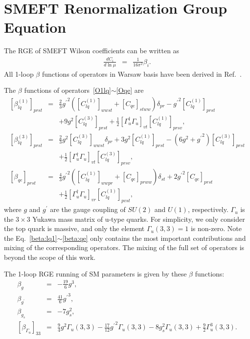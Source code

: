 \documentclass[a4paper,11pt]{article}
\begin{document}
\appendix
	



\section{SMEFT Renormalization Group Equation}\label{smeftrge}
The RGE of SMEFT Wilson coefficients can be written as 
\begin{eqnarray}
  \frac{dC_i}{d\ln{\mu}} &=& \frac{1}{16\pi^2}\beta_i. \label{beta:definition}
\end{eqnarray}
All 1-loop $\beta$ functions of operators in Warsaw basis have been derived in Ref.~\cite{Celis:2017hod}. 

The $\beta$ functions of operators~\ref{O1lq}$\sim$\ref{Oqe} are
\begin{eqnarray}
   \left[\beta^{(1)}_{lq}\right]_{prst} &=& \frac{2}{3}{g^\prime}^2\left([C^{(1)}_{lq}]_{wwst}+[C_{qe}]_{stww}\right)\delta_{pr}-{g^\prime}^2[C^{(1)}_{lq}]_{prst}  \nonumber \\
   &&+9g^2[C^{(3)}_{lq}]_{prst}+\frac{1}{2}[\Gamma_u^\dagger\Gamma_u]_{vt}[C^{(1)}_{lq}]_{prsv}, \label{beta:lq1}  \\
   \left[\beta^{(3)}_{lq}\right]_{prst} &=& \frac{2}{3}g^2[C^{(3)}_{lq}]_{wwst}\delta_{pr}+3g^2[C^{(1)}_{lq}]_{prst}-(6g^2+{g^\prime}^2)[C^{(3)}_{lq}]_{prst}  \nonumber \\ 
   && +\frac{1}{2}[\Gamma_u^\dagger\Gamma_u]_{vt}[C^{(3)}_{lq}]_{prsv}, \label{beta:lq3} \\
   \left[\beta_{qe}\right]_{prst} &=& \frac{4}{3}{g^{\prime}}^2\left([C^{(1)}_{lq}]_{wwpr}+[C_{qe}]_{prww}\right)\delta_{st}+2{g^{\prime}}^2[C_{qe}]_{prst} \nonumber  \\
   && +\frac{1}{2}[\Gamma_u^\dagger\Gamma_u]_{vr}[C^{(1)}_{lq}]_{pvst}, \label{beta:qe}
\end{eqnarray}
where $g$ and $g^\prime$ are the gauge coupling of $SU(2)$ and $U(1)$, respectively. 
$\Gamma_{u}$ is the $3\times 3$ Yukawa mass matrix of u-type quarks. 
For simplicity, we only consider the top quark is massive, 
and only the element $\Gamma_u(3,3)=1$ is non-zero.
Note the Eq.~\ref{beta:lq1}$\sim$\ref{beta:qe} only contains the most important contributions and mixing of the corresponding operators. 
The mixing of the full set of operators is beyond the scope of this work. 

The 1-loop RGE running of SM parameters is given by these $\beta$ functions:
\begin{eqnarray}
  \beta_{g} &=& -\frac{19}{6}g^3,  \\
  \beta_{g^\prime} &=& \frac{41}{6}{g^\prime}^3,  \\
  \beta_{g_s} &=& -7g^2_s, \\
  \left[\beta_{\Gamma_u}\right]_{33} &=& \frac{9}{4}g^2\Gamma_u(3,3)-\frac{17}{12} {g^\prime}^2\Gamma_u(3,3)-8g^2_s\Gamma_u(3,3)+\frac{9}{2}\Gamma^3_u(3,3).
\end{eqnarray}
\end{document}
